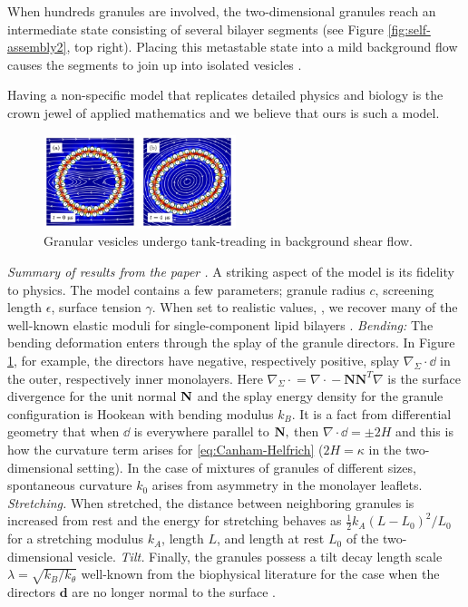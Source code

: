When hundreds granules are involved,
the two-dimensional granules reach an intermediate
state consisting of several bilayer segments (see Figure \ref{fig:self-assembly2}, top right).
Placing this metastable state into a mild background flow
causes the segments to join up into isolated vesicles \cite{fu-ryh-qua-you2022}.

Having a non-specific model that replicates detailed
physics and biology is the crown jewel of applied mathematics
and we believe that ours is such a model. 

\begin{figure}
\includegraphics[width=0.5\textwidth]{figures/PreliminaryWork/TankTreading.jpg}
\caption{\label{fig:JPv_linearshear}Granular vesicles undergo
tank-treading in background shear flow.}
\end{figure}
\textit{Summary of results from the paper \cite{Fu2018_SIAM}.}
A striking aspect of the
model is its fidelity to physics.
The model contains a few
parameters; granule radius $c$,
screening length $\epsilon$,
surface tension $\gamma$.
When set to realistic values,
\cite{Fu2018_SIAM, ErLjCl89, Lin2005, Parsegian, Israelachvili80, GarciaSaez, KUZMIN2005, Petelska2012,Jackson2016},
we recover many of the well-known
elastic moduli for single-component lipid bilayers
\cite{Nagle17, Nagle17-2, LeVeWa14,NAGLE2000159}.
\emph{Bending:}
The bending deformation enters through the splay of the
granule directors.  In Figure \ref{fig:JPv_linearshear},
for example, the directors have negative, respectively positive,
splay $\nabla_{\Sigma} \cdot \dd$
in the outer, respectively inner monolayers.
Here $\nabla_{\Sigma}\cdot{} = \nabla \cdot {} - \mathbf{N}\mathbf{N}^T \nabla$
is the surface divergence for the unit normal $\mathbf{N}$
and the splay energy density
for the granule configuration is Hookean with bending modulus $k_B$.
It is a fact from differential geometry that
when $\dd$ is everywhere parallel to $\mathbf{N},$
then $\nabla\cdot \dd = \pm 2H$ and this is how the
curvature term arises for \eqref{eq:Canham-Helfrich}
($2H = \kappa$ in the two-dimensional setting).
In the case of mixtures of granules of different sizes,
spontaneous curvature $k_0$ arises
from asymmetry in the monolayer leaflets.
\emph{Stretching.}
When stretched, the distance between
neighboring granules is increased from rest
and the energy for stretching behaves as 
$\tfrac{1}{2}k_A(L - L_0)^2/L_0$
for a stretching modulus $k_A$,
length $L$, and
length at rest $L_0$ of the two-dimensional vesicle. 
\emph{Tilt.}
Finally, the granules possess a 
tilt decay length scale $\lambda = \sqrt{k_B/k_{\theta}}$
well-known from the biophysical literature
for the case when the directors $\mathbf{d}$ are no longer normal
to the surface
\cite{KUZMIN2005}.

